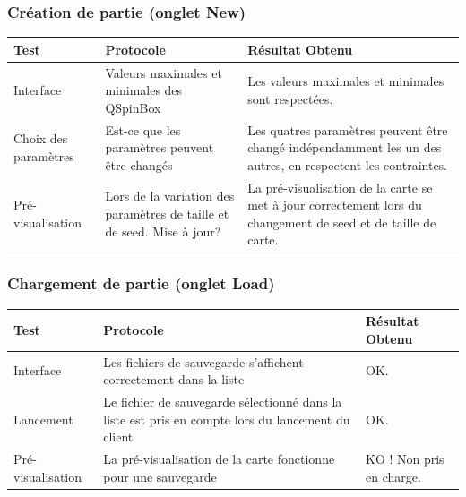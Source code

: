 \documentclass[a4paper,10pt,openany,oneside]{report}
\begin{document}
\subsubsection{Création de partie (onglet New)}
\begin{center}
	\begin{tabular}{| p{3cm} | p{6cm} | p{6cm} |}
	\hline
		 \textbf{Test} & \textbf{Protocole} & \textbf{Résultat Obtenu}
\\ \hline
		 Interface & Valeurs maximales et minimales des QSpinBox & Les valeurs maximales et minimales sont respectées.
		 \\ \hline
		Choix des paramètres & Est-ce que les paramètres peuvent être changés & Les quatres paramètres peuvent être changé indépendamment les un des autres, en respectent les contraintes.
		\\ \hline
		Pré-visualisation & Lors de la variation des paramètres de taille et de seed. Mise à jour? & La pré-visualisation de la carte se met à jour correctement lors du changement de seed et de taille de carte.
		\\ \hline
	\end{tabular}
\end{center}

\subsubsection{Chargement de partie (onglet Load)}
\begin{center}
	\begin{tabular}{| p{3cm} | p{6cm} | p{6cm} |}
	\hline
		 \textbf{Test} & \textbf{Protocole} & \textbf{Résultat Obtenu}
		 \\ \hline
		 Interface & Les fichiers de sauvegarde s'affichent correctement dans la liste & OK.
		 \\ \hline
		 Lancement & Le fichier de sauvegarde sélectionné dans la liste est pris en compte lors du lancement du client & OK.
		 \\ \hline
		 Pré-visualisation & La pré-visualisation de la carte fonctionne pour une sauvegarde & KO ! Non pris en charge.
		\\ \hline
	\end{tabular}
\end{center}
\end{document}
